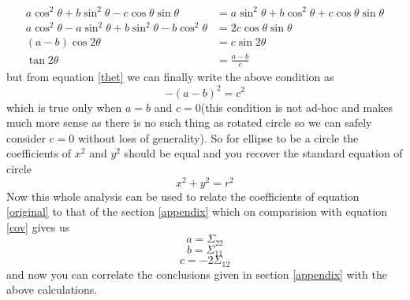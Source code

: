 \documentclass[a4paper]{article}
\begin{document}
\[
\begin{split}
a\cos^{2}\theta+b\sin^{2}\theta-c\cos\theta\sin\theta &= a\sin^{2}\theta+b\cos^{2}\theta+c\cos\theta\sin\theta \\
a\cos^{2}\theta-a\sin^{2}\theta+b\sin^{2}\theta-b\cos^{2}\theta &=2c\cos\theta\sin\theta \\
(a-b)\cos2\theta &=c\sin2\theta \\
\tan2\theta &= \frac{a-b}{c}
\end{split}
\]but from equation \ref{thet} we can finally write the above condition as
\begin{equation}
-(a-b)^{2}=c^{2}
\end{equation}which is true only when $a=b$ and $c=0$(this condition is not ad-hoc and makes much more sense as there is no such thing as rotated circle so we can safely consider $c=0$ without loss of generality). So for ellipse to be a circle the coefficients of $x^{2}$ and $y^{2}$ should be equal and you recover the standard equation of circle
\begin{equation}
x^{2}+y^{2}=r^{2}
\end{equation}Now this whole analysis can be used to relate the coefficients of equation \ref{original} to that of the section \ref{appendix} which on comparision with equation \ref{cov} gives us
\[
a = \Sigma_{22}
\]
\[
b = \Sigma_{11}
\]
\[
c = -2\Sigma_{12}
\]and now you can correlate the conclusions given in section \ref{appendix} with the above calculations.


\end{document}
